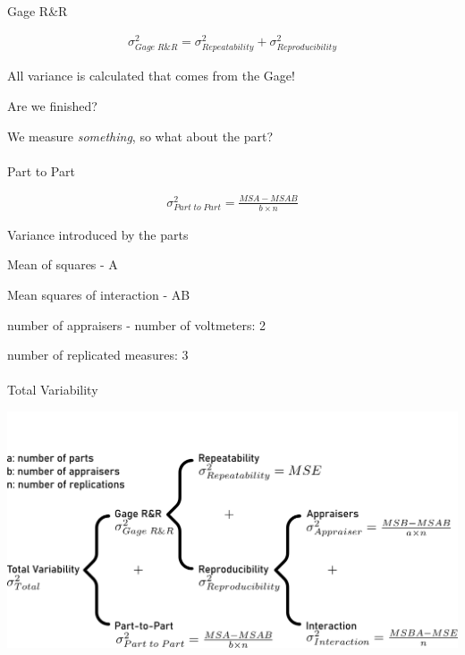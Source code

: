 \documentclass[
  a4paper,
]{scrbook}
\makeatletter
\let\oldparagraph\paragraph
\renewcommand{\paragraph}{
    \@ifstar
      \xxxParagraphStar
      \xxxParagraphNoStar
  }
\newcommand{\xxxParagraphStar}[1]{\oldparagraph*{#1}\mbox{}}
\newcommand{\xxxParagraphNoStar}[1]{\oldparagraph{#1}\mbox{}}
\providecommand{\tightlist}{%
  \setlength{\itemsep}{0pt}\setlength{\parskip}{0pt}}\usepackage{longtable,booktabs,array}
\let\olddescription\description
\let\endolddescription\enddescription
\renewenvironment{description}{
          \begin{spacing}{1.5}\olddescription
        }{
          \endolddescription\end{spacing}
        }
\makeatother
\begin{document}
\paragraph{Gage R\&R}\label{gage-rr}

\begin{align}
\sigma^2_{Gage\;R\&R} = \sigma^2_{Repeatability} + \sigma^2_{Reproducibility}
\end{align}

All variance is calculated that comes from the Gage!

Are we finished?

We measure \emph{something}, so what about the part?

\paragraph{Part to Part}\label{part-to-part}

\begin{align}
\sigma^2_{Part\; to \; Part} = \frac{MSA-MSAB}{b \times n}
\end{align}

\begin{description}
\tightlist
\item[\(\sigma^2_{Part\; to \; Part}\)]
Variance introduced by the parts
\item[\(MSA\)]
Mean of squares - A
\item[\(MSAB\)]
Mean squares of interaction - AB
\item[\(b\)]
number of appraisers - number of voltmeters: 2
\item[\(n\)]
number of replicated measures: 3
\end{description}

\paragraph{Total Variability}\label{total-variability}

\includegraphics[width=0.95\linewidth,height=\textheight,keepaspectratio]{chapter004/gage_rr_total.png}
\end{document}
